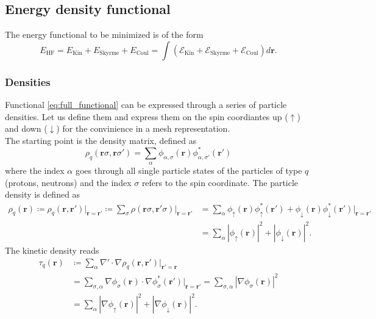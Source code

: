 \subsection{Energy density functional}
The energy functional to be minimized is of the form \cite{Bender2003}
\begin{equation}
\label{eq:full_functional}
E_{\text{HF}} =  E_\text{Kin}+E_\text{Skyrme}+E_\text{Coul} = \int( \mathcal E_\text{Kin} + \mathcal E_\text{Skyrme} + \mathcal E_\text{Coul})d\bm r.
\end{equation}
\subsubsection{Densities}
Functional \eqref{eq:full_functional} can be expressed through a series of particle densities. Let us define them and express them on the spin coordiantes up ($\uparrow$) and down ($\downarrow$) for the convinience in a mesh representation.
\\The starting point is the density matrix, defined as
\begin{equation}
    \rho_q (\mathbf r \sigma, \mathbf r \sigma') = \sum_{\alpha} \phi_{\alpha, \sigma} (\mathbf r )\phi_{\alpha, \sigma'}^*(\mathbf r')
\end{equation}
where the index $\alpha$ goes through all single particle states of the particles of type $q$ (protons, neutrons) and the index $\sigma$ refers to the spin coordinate. The particle density is defined as 
\begin{align}
    \rho_q(\mathbf r) \coloneq\rho_q(\mathbf r, \mathbf r')\bigg|_{\mathbf{r} = \mathbf{r'}} \coloneq \sum_{\sigma}\rho(\mathbf r\sigma, \mathbf r'\sigma) \bigg|_{\mathbf{r} = \mathbf{r'}} &=\sum_{\alpha} \phi_{\uparrow}(\mathbf r)\phi_{\uparrow}^*(\mathbf r')+\phi_{\downarrow}(\mathbf r)\phi_{\downarrow}^*(\mathbf r') \bigg|_{\mathbf{r} = \mathbf{r'}} \nonumber
    \\&=\sum_{\alpha} |\phi_{\uparrow}(\mathbf r)|^2+|\phi_{\downarrow}(\mathbf r)|^2.
    \label{eq:part_density}
\end{align}
The kinetic density reads
\begin{align}
    \tau_q(\mathbf r) &\coloneq \sum_{\alpha} \nabla'\cdot\nabla\rho_q(\mathbf r, \mathbf r')\bigg|_{\mathbf r'=\mathbf r} \nonumber
    \\&= \sum_{\sigma, \alpha} \nabla \phi_\sigma (\mathbf r)\cdot \nabla \phi_\sigma^*(\mathbf r')\bigg|_{\mathbf r = \mathbf r'} = \sum_{\sigma, \alpha} |\nabla \phi_\sigma(\mathbf r)|^2 \nonumber
    \\&= \sum_{\alpha}|\nabla \phi_\uparrow(\mathbf r)|^2 + |\nabla \phi_\downarrow(\mathbf r)|^2 \label{eq:kin_density}.
\end{align}

